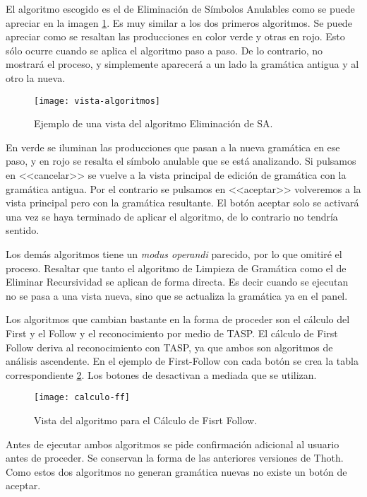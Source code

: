 El algoritmo escogido es el de Eliminación de Símbolos Anulables como se puede apreciar en la imagen \ref{fig:6.8}. Es muy similar a los dos primeros algoritmos. Se puede apreciar como se resaltan las producciones en color verde y otras en rojo. Esto sólo ocurre cuando se aplica el algoritmo paso a paso. De lo contrario, no mostrará el proceso, y simplemente aparecerá a un lado la gramática antigua y al otro la nueva.

\begin{figure}[h]
\centering
\texttt{[image: vista-algoritmos]}
\caption{Ejemplo de una vista del algoritmo Eliminación de SA.}
\label{fig:6.8}
\end{figure}

En verde se iluminan las producciones que pasan a la nueva gramática en ese paso, y en rojo se resalta el símbolo anulable que se está analizando. Si pulsamos en <<cancelar>> se vuelve a la vista principal de edición de gramática con la gramática antigua. Por el contrario se pulsamos en <<aceptar>> volveremos a la vista principal pero con la gramática resultante. El botón aceptar solo se activará una vez se haya terminado de aplicar el algoritmo, de lo contrario no tendría sentido. 

Los demás algoritmos tiene un \emph{modus operandi} parecido, por lo que omitiré el proceso. Resaltar que tanto el algoritmo de Limpieza de Gramática como el de Eliminar Recursividad se aplican de forma directa. Es decir cuando se ejecutan no se pasa a una vista nueva, sino que se actualiza la gramática ya en el panel.

Los algoritmos que cambian bastante en la forma de proceder son el cálculo del First y el Follow y el reconocimiento por medio de TASP. El cálculo de First Follow deriva al reconocimiento con TASP, ya que ambos son algoritmos de análisis ascendente. En el ejemplo de First-Follow con cada botón se crea la tabla correspondiente \ref{fig:6.9}. Los botones de desactivan a mediada que se utilizan.

\begin{figure}[h]
\centering
\texttt{[image: calculo-ff]}
\caption{Vista del algoritmo para el Cálculo de Fisrt Follow.}
\label{fig:6.9}
\end{figure}

Antes de ejecutar ambos algoritmos se pide confirmación adicional al usuario antes de proceder. Se conservan la forma de las anteriores versiones de Thoth. Como estos dos algoritmos no generan gramática nuevas no existe un botón de aceptar.

